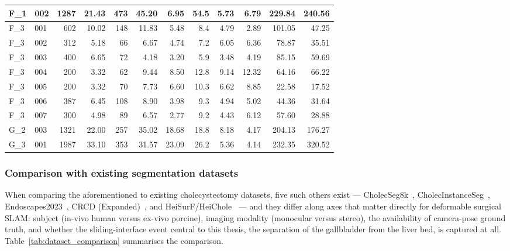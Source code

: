 \documentclass{article}
\begin{document}
\begin{table}[ht]
{\begin{tabular}{llrrrrrrrrrr}
\hline
F\_1 & 002 & 1287 & 21.43 & 473 & 45.20 &  6.95 & 54.5 &  5.73 &  6.79 & 229.84 & 240.56 \\
\hline
F\_3 & 001 &  602 & 10.02 & 148 & 11.83 &  5.48 &  8.4 &  4.79 &  2.89 & 101.05 &  47.25 \\
F\_3 & 002 &  312 &  5.18 &  66 &  6.67 &  4.74 &  7.2 &  6.05 &  6.36 &  78.87 &  35.51 \\
F\_3 & 003 &  400 &  6.65 &  72 &  4.18 &  3.20 &  5.9 &  3.48 &  4.19 &  85.15 &  59.69 \\
F\_3 & 004 &  200 &  3.32 &  62 &  9.44 &  8.50 & 12.8 &  9.14 & 12.32 &  64.16 &  66.22 \\
F\_3 & 005 &  200 &  3.32 &  70 &  7.73 &  6.60 & 10.3 &  6.62 &  8.85 &  22.58 &  17.52 \\
F\_3 & 006 &  387 &  6.45 & 108 &  8.90 &  3.98 &  9.3 &  4.94 &  5.02 &  44.36 &  31.64 \\
F\_3 & 007 &  300 &  4.98 &  89 &  6.57 &  2.77 &  9.2 &  4.43 &  6.12 &  57.60 &  28.88 \\
\hline
G\_2 & 003 & 1321 & 22.00 & 257 & 35.02 & 18.68 & 18.8 &  8.18 &  4.17 & 204.13 & 176.27 \\
\hline
G\_3 & 001 & 1987 & 33.10 & 353 & 31.57 & 23.09 & 26.2 &  5.36 &  4.14 & 232.35 & 320.52 \\
\hline
\end{tabular}%
}
\end{table}
\FloatBarrier
\subsubsection{Comparison with existing segmentation datasets}
\label{sec:dataset_comparison}
When comparing the aforementioned to existing cholecystectomy datasets, five such others exist --- CholecSeg8k~\cite{Hong2020}, CholecInstanceSeg~\cite{Alabi2025}, Endoscapes2023~\cite{Murali2024}, CRCD (Expanded)~\cite{Oh2024}, and HeiSurF/HeiChole~\cite{Wagner2023} --- and they differ along axes that matter directly for deformable surgical SLAM: subject (in-vivo human versus ex-vivo porcine), imaging modality (monocular versus stereo), the availability of camera-pose ground truth, and whether the sliding-interface event central to this thesis, the separation of the gallbladder from the liver bed, is captured at all. Table~\ref{tab:dataset_comparison} summarises the comparison.
\end{document}
